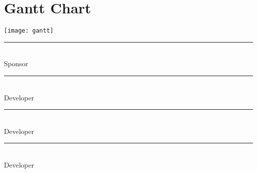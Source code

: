 \documentclass[letterpaper,10pt,titlepage]{article}
\begin{document}
\section{Gantt Chart}
\texttt{[image: gantt]}





\newpage
\textbf{ }
\vspace{5.0cm}

\noindent\rule{13cm}{0.4pt}\\
Sponsor
\vspace{3.0cm}

\noindent\rule{13cm}{0.4pt}\\
Developer
\vspace{3.0cm}


\noindent\rule{13cm}{0.4pt}\\
Developer
\vspace{3.0cm}


\noindent\rule{13cm}{0.4pt}\\
Developer
\vspace{3.0cm}
\end{document}
